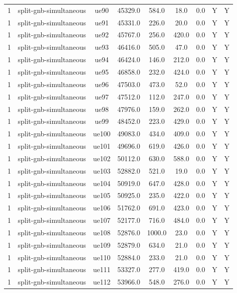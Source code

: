 \begin{table}[ht]
\begin{tabular}{|c|c|c|c|c|c|c|c|c|}
1 & split-gnb-simultaneous & ue90 & 45329.0 & 584.0 & 18.0 & 0.0 & Y & Y \\
1 & split-gnb-simultaneous & ue91 & 45331.0 & 226.0 & 20.0 & 0.0 & Y & Y \\
1 & split-gnb-simultaneous & ue92 & 45767.0 & 256.0 & 420.0 & 0.0 & Y & Y \\
1 & split-gnb-simultaneous & ue93 & 46416.0 & 505.0 & 47.0 & 0.0 & Y & Y \\
1 & split-gnb-simultaneous & ue94 & 46424.0 & 146.0 & 212.0 & 0.0 & Y & Y \\
1 & split-gnb-simultaneous & ue95 & 46858.0 & 232.0 & 424.0 & 0.0 & Y & Y \\
1 & split-gnb-simultaneous & ue96 & 47503.0 & 473.0 & 52.0 & 0.0 & Y & Y \\
1 & split-gnb-simultaneous & ue97 & 47512.0 & 112.0 & 247.0 & 0.0 & Y & Y \\
1 & split-gnb-simultaneous & ue98 & 47976.0 & 159.0 & 262.0 & 0.0 & Y & Y \\
1 & split-gnb-simultaneous & ue99 & 48452.0 & 223.0 & 429.0 & 0.0 & Y & Y \\
1 & split-gnb-simultaneous & ue100 & 49083.0 & 434.0 & 409.0 & 0.0 & Y & Y \\
1 & split-gnb-simultaneous & ue101 & 49696.0 & 619.0 & 426.0 & 0.0 & Y & Y \\
1 & split-gnb-simultaneous & ue102 & 50112.0 & 630.0 & 588.0 & 0.0 & Y & Y \\
1 & split-gnb-simultaneous & ue103 & 52882.0 & 521.0 & 19.0 & 0.0 & Y & Y \\
1 & split-gnb-simultaneous & ue104 & 50919.0 & 647.0 & 428.0 & 0.0 & Y & Y \\
1 & split-gnb-simultaneous & ue105 & 50925.0 & 235.0 & 422.0 & 0.0 & Y & Y \\
1 & split-gnb-simultaneous & ue106 & 51762.0 & 691.0 & 423.0 & 0.0 & Y & Y \\
1 & split-gnb-simultaneous & ue107 & 52177.0 & 716.0 & 484.0 & 0.0 & Y & Y \\
1 & split-gnb-simultaneous & ue108 & 52876.0 & 1000.0 & 23.0 & 0.0 & Y & Y \\
1 & split-gnb-simultaneous & ue109 & 52879.0 & 634.0 & 21.0 & 0.0 & Y & Y \\
1 & split-gnb-simultaneous & ue110 & 52884.0 & 233.0 & 21.0 & 0.0 & Y & Y \\
1 & split-gnb-simultaneous & ue111 & 53327.0 & 277.0 & 419.0 & 0.0 & Y & Y \\
1 & split-gnb-simultaneous & ue112 & 53966.0 & 548.0 & 276.0 & 0.0 & Y & Y \\

\end{tabular}
\end{table}
